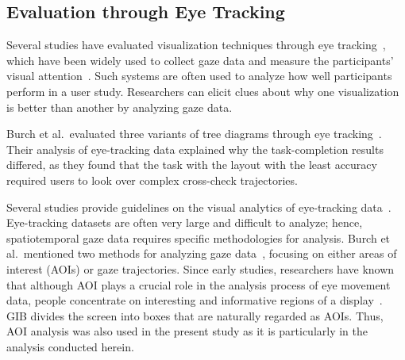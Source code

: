 \documentclass{vgtc}                          %
\begin{document}
\subsection{Evaluation through Eye Tracking}
Several studies have evaluated visualization techniques through eye tracking~\cite{burch2011evaluation,pohl2009comparing,netzel2014comparative,jianu2014display,7539393}, which have been widely used to collect gaze data and measure the participants' visual attention~\cite{andrienko2012visual,duchowski2007eye,kurzhals2014evaluating}.
Such systems are often used to analyze how well participants perform in a user study. Researchers can elicit clues about why one visualization is better than another by analyzing gaze data.

Burch et al.\ evaluated three variants of tree diagrams through eye tracking~\cite{burch2011evaluation}. 
Their analysis of eye-tracking data explained why the task-completion results differed, as they found that the task with the layout with the least accuracy required users to look over complex cross-check trajectories.

Several studies provide guidelines on the visual analytics of eye-tracking data~\cite{andrienko2012visual,kurzhals2014evaluating,duchowski2007eye}.
Eye-tracking datasets are often very large and difficult to analyze; hence, spatiotemporal gaze data requires specific methodologies for analysis.
Burch et al.\ mentioned two methods for analyzing gaze data~\cite{Burch2013VisualTS}, focusing on either areas of interest (AOIs) or gaze trajectories.
Since early studies, researchers have known that although AOI plays a crucial role in the analysis process of eye movement data, people concentrate on interesting and informative regions of a display~\cite{yarbus1967eye}.
GIB divides the screen into boxes that are naturally regarded as AOIs. Thus, AOI analysis was also used in the present study as it is particularly in the analysis conducted herein.%
\end{document}
